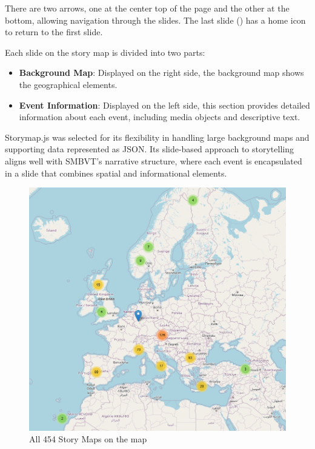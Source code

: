There are two arrows, one at the center top of the page and the other at the bottom, allowing navigation through the slides. The last slide () has a home icon to return to the first slide.

Each slide on the story map is divided into two parts:
\begin{itemize}
    \item \textbf{Background Map}: Displayed on the right side, the background map shows the geographical elements.
    \item \textbf{Event Information}: Displayed on the left side, this section provides detailed information about each event, including media objects and descriptive text.
\end{itemize}

Storymap.js was selected for its flexibility in handling large background maps and supporting data represented as JSON. Its slide-based approach to storytelling aligns well with SMBVT’s narrative structure, where each event is encapsulated in a slide that combines spatial and informational elements.

\begin{figure}[h!tb]
    \centerline {\includegraphics[scale=0.6]{img/allStorymapsMoving.png}}
    \caption{All 454 Story Maps on the map}
    \label{fig:allStorymaps}
\end{figure}

